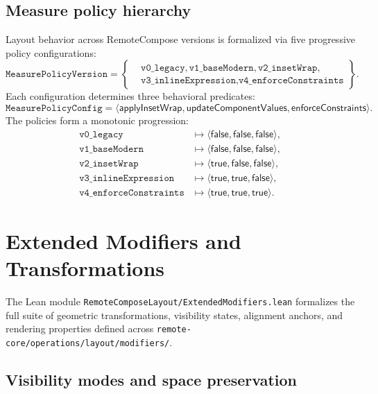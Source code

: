 \documentclass[11pt,a4paper]{article}
\newcommand{\lo}[1]{\texttt{#1}}       %
\newcommand{\file}[1]{\texttt{#1}}
\theoremstyle{definition}
\theoremstyle{plain}
\theoremstyle{remark}
\begin{document}
\subsection{Measure policy hierarchy}
\label{sec:opt-policies}

Layout behavior across RemoteCompose versions is formalized via five progressive
policy configurations:
\[
  \lo{MeasurePolicyVersion} = \left\{
  \begin{aligned}
    &\lo{v0\_legacy}, \lo{v1\_baseModern}, \lo{v2\_insetWrap}, \\
    &\lo{v3\_inlineExpression}, \lo{v4\_enforceConstraints}
  \end{aligned}
  \right\}.
\]
Each configuration determines three behavioral predicates:
\[
  \lo{MeasurePolicyConfig} = \langle \textsf{applyInsetWrap},
  \textsf{updateComponentValues}, \textsf{enforceConstraints} \rangle.
\]
The policies form a monotonic progression:
\begin{align*}
  \lo{v0\_legacy}             &\mapsto \langle \textsf{false}, \textsf{false}, \textsf{false} \rangle, \\
  \lo{v1\_baseModern}         &\mapsto \langle \textsf{false}, \textsf{false}, \textsf{false} \rangle, \\
  \lo{v2\_insetWrap}          &\mapsto \langle \textsf{true},  \textsf{false}, \textsf{false} \rangle, \\
  \lo{v3\_inlineExpression}   &\mapsto \langle \textsf{true},  \textsf{true},  \textsf{false} \rangle, \\
  \lo{v4\_enforceConstraints} &\mapsto \langle \textsf{true},  \textsf{true},  \textsf{true}  \rangle.
\end{align*}

\section{Extended Modifiers and Transformations}
\label{sec:extended-modifiers}

The Lean module \file{RemoteComposeLayout/ExtendedModifiers.lean} formalizes
the full suite of geometric transformations, visibility states, alignment anchors,
and rendering properties defined across \file{remote-core/operations/layout/modifiers/}.

\subsection{Visibility modes and space preservation}
\label{sec:mod-visibility}
\end{document}
